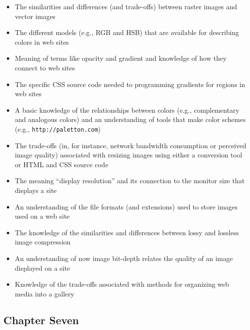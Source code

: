 \documentclass[11pt]{article}
\newcommand{\program}[1]{\lstinline{#1}}
\begin{document}
\begin{itemize}

  \itemsep 0in

  \item The similarities and differences (and trade-offs) between raster images
    and vector images

  \item The different models (e.g., RGB and HSB) that are available for
    describing colors in web sites

  \item Meaning of terms like opacity and gradient and knowledge of how
    they connect to web sites

  \item The specific CSS source code needed to programming gradients for regions
    in web sites

  \item A basic knowledge of the relationships between colors (e.g.,
    complementary and analogous colors) and an understanding of tools that make
    color schemes (e.g., \program{http://paletton.com})

  \item The trade-offs (in, for instance, network bandwidth consumption or
    perceived image quality) associated with resizing images using either a
    conversion tool or HTML and CSS source code

  \item The meaning ``display resolution'' and its connection to the monitor
    size that displays a site

  \item An understanding of the file formats (and extensions) used to store
    images used on a web site

  \item The knowledge of the similarities and differences between lossy and
    lossless image compression

  \item An understanding of now image bit-depth relates the quality of an image
    displayed on a site

  \item Knowledge of the trade-offs associated with methods for organizing web
    media into a gallery

\end{itemize}

\vspace*{-.2in}
\subsection*{Chapter Seven}
\end{document}

